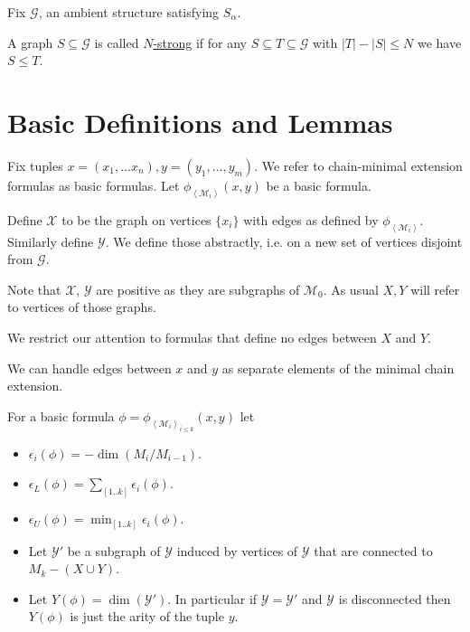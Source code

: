 \documentclass{amsart}
\newcommand{\GG}{\mathcal G}
\newcommand{\defn}{\underline}
\newcommand{\M}{\mathcal M}
\newcommand{\X}{\mathcal X}
\newcommand{\Y}{\mathcal Y}
\newcommand{\paren}[1]{\left(#1\right)}
\newcommand{\agl}[1]{\left\langle #1 \right\rangle}
\begin{document}
Fix $\GG$, an ambient structure satisfying $S_\alpha$.

\begin{Definition}
  A graph $S \subseteq \GG$ is called \defn{$N$-strong} if for any $S \subseteq T \subseteq \GG$ with $|T| - |S| \leq N$ we have $S \leq T$.
\end{Definition}

\section{Basic Definitions and Lemmas}

Fix tuples $x = (x_1, \ldots x_n), y = (y_1, \ldots, y_m)$.
We refer to chain-minimal extension formulas as basic formulas.
Let $\phi_{\agl{\M_i}}(x, y)$ be a basic formula.

\begin{Definition}
  Define $\X$ to be the graph on vertices $\{x_i\}$ with edges as defined by $\phi_{\agl{\M_i}}$.
  Similarly define $\Y$.
  We define those abstractly, i.e. on a new set of vertices disjoint from $\GG$.
\end{Definition}

Note that $\X$, $\Y$ are positive as they are subgraphs of $\M_0$.
As usual $X, Y$ will refer to vertices of those graphs.

We restrict our attention to formulas that define no edges between $X$ and $Y$.

\begin{Note} \label{note_edges}
  We can handle edges between $x$ and $y$ as separate elements of the minimal chain extension.
\end{Note}

\begin{Definition} \label{def_basic}
  For a basic formula $\phi = \phi_{\agl{\M_i}_{i \leq k}}(x, y)$ let
  \begin{itemize}
  \item $\epsilon_i(\phi) = -\dim \paren{M_i/M_{i-1}}$.
  \item $\epsilon_L(\phi) = \sum_{[1..k]} \epsilon_i(\phi)$.
  \item $\epsilon_U(\phi) = \min_{[1..k]} \epsilon_i(\phi)$.
  \item Let $\Y'$ be a subgraph of $\Y$ induced by vertices of $\Y$ that are connected to $M_k - (X \cup Y)$.
  \item Let $Y(\phi) = \dim (\Y')$.
    In particular if $\Y = \Y'$ and $\Y$ is disconnected then $Y(\phi)$ is just the arity of the tuple $y$.
  \end{itemize}
\end{Definition}
\end{document}
